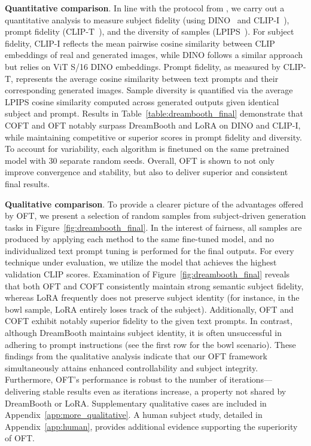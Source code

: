 \textbf{Quantitative comparison}. In line with the protocol from \cite{ruiz2023dreambooth}, we carry out a quantitative analysis to measure subject fidelity (using DINO~\cite{caron2021emerging} and CLIP-I~\cite{radford2021learning}), prompt fidelity (CLIP-T~\cite{radford2021learning}), and the diversity of samples (LPIPS~\cite{zhang2018unreasonable}). For subject fidelity, CLIP-I reflects the mean pairwise cosine similarity between CLIP embeddings of real and generated images, while DINO follows a similar approach but relies on ViT S/16 DINO embeddings. Prompt fidelity, as measured by CLIP-T, represents the average cosine similarity between text prompts and their corresponding generated images. Sample diversity is quantified via the average LPIPS cosine similarity computed across generated outputs given identical subject and prompt. Results in Table~\ref{table:dreambooth_final} demonstrate that COFT and OFT notably surpass DreamBooth and LoRA on DINO and CLIP-I, while maintaining competitive or superior scores in prompt fidelity and diversity. To account for variability, each algorithm is finetuned on the same pretrained model with 30 separate random seeds. Overall, OFT is shown to not only improve convergence and stability, but also to deliver superior and consistent final results.

\textbf{Qualitative comparison}. To provide a clearer picture of the advantages offered by OFT, we present a selection of random samples from subject-driven generation tasks in Figure~\ref{fig:dreambooth_final}. In the interest of fairness, all samples are produced by applying each method to the same fine-tuned model, and no individualized text prompt tuning is performed for the final outputs. For every technique under evaluation, we utilize the model that achieves the highest validation CLIP scores. Examination of Figure~\ref{fig:dreambooth_final} reveals that both OFT and COFT consistently maintain strong semantic subject fidelity, whereas LoRA frequently does not preserve subject identity (for instance, in the bowl sample, LoRA entirely loses track of the subject). Additionally, OFT and COFT exhibit notably superior fidelity to the given text prompts. In contrast, although DreamBooth maintains subject identity, it is often unsuccessful in adhering to prompt instructions (see the first row for the bowl scenario). These findings from the qualitative analysis indicate that our OFT framework simultaneously attains enhanced controllability and subject integrity. Furthermore, OFT's performance is robust to the number of iterations—delivering stable results even as iterations increase, a property not shared by DreamBooth or LoRA. Supplementary qualitative cases are included in Appendix~\ref{app:more_qualitative}. A human subject study, detailed in Appendix~\ref{app:human}, provides additional evidence supporting the superiority of OFT.

